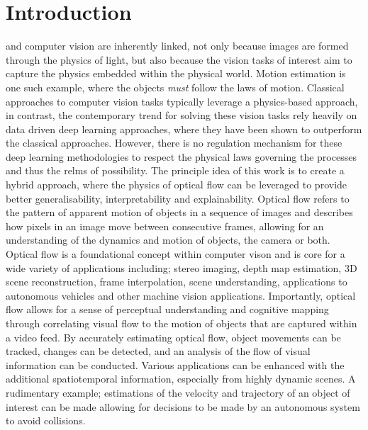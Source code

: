 \section{Introduction}\label{sec:intro}

 and computer vision are inherently linked, not only because images are formed through the physics of light, but also because the vision tasks of interest aim to capture the physics embedded within the physical world. Motion estimation is one such example, where the objects \textit{must} follow the laws of motion. Classical approaches to computer vision tasks typically leverage a physics-based approach, in contrast, the contemporary trend for solving these vision tasks rely heavily on data driven deep learning approaches, where they have been shown to outperform the classical approaches. However, there is no regulation mechanism for these deep learning methodologies to respect the physical laws governing the processes and thus the relms of possibility. The principle idea of this work is to create a hybrid approach, where the physics of optical flow can be leveraged to provide better generalisability, interpretability and explainability.
\IEEEPARstart{}{} Optical flow refers to the pattern of apparent motion of objects in a sequence of images and describes how pixels in an image move between consecutive frames, allowing for an understanding of the dynamics and motion of objects, the camera or both. Optical flow is a foundational concept within computer vison and is core for a wide variety of applications including; stereo imaging, depth map estimation, 3D scene reconstruction, frame interpolation, scene understanding, applications to autonomous vehicles and other machine vision applications.
\IEEEPARstart{}{} Importantly, optical flow allows for a sense of perceptual understanding and cognitive mapping through correlating visual flow to the motion of objects that are captured within a video feed. By accurately estimating optical flow, object movements can be tracked, changes can be detected, and an analysis of the flow of visual information can be conducted. Various applications can be enhanced with the additional spatiotemporal information, especially from highly dynamic scenes. A rudimentary example; estimations of the velocity and trajectory of an object of interest can be made allowing for decisions to be made by an autonomous system to avoid collisions.
